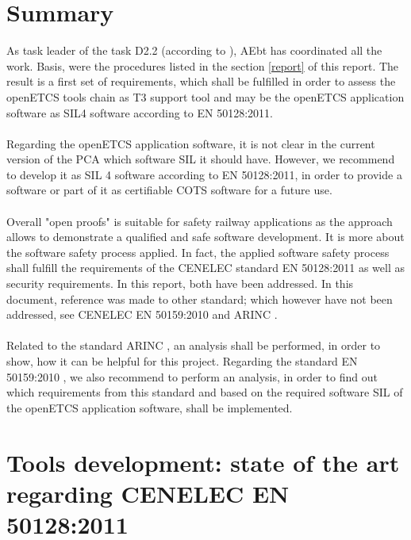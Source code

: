 \documentclass{template/openetcs_report}
\begin{document}
\chapter{Summary}
As task leader of the task D2.2 (according to \cite{FPP13}), AEbt has coordinated all the work. Basis, were the procedures listed in the section \ref{report} of this report. The result is a first set of requirements, which shall be fulfilled in order to assess the openETCS tools chain as T3 support tool and may be the openETCS application software as SIL4 software according to EN 50128:2011. \\\\Regarding the openETCS application software, it is not clear in the current version of the PCA \cite{PCA12} which software SIL it should have. However, we recommend to develop it as SIL 4 software according to EN 50128:2011, in order to provide a software or part of it as certifiable COTS software for a future use.\\\\
Overall "open proofs" is suitable for safety railway applications as the approach allows to demonstrate a qualified and safe software development. It is more about the software safety process applied. In fact, the applied software safety process shall fulfill the requirements of the CENELEC standard EN 50128:2011 as well as security requirements. In this report, both have been addressed.
In this document, reference was made to other standard; which however have not been addressed, see CENELEC EN 50159:2010 \cite{EN50159} and ARINC \cite{ARINC}.\\\\
Related to the standard ARINC \cite{ARINC}, an analysis shall be performed, in order to show, how it can be helpful for this project. Regarding the standard EN 50159:2010 \cite{EN50159}, we also recommend to perform an analysis, in order to find out which requirements from this standard and based on the required software SIL of the openETCS application software, shall be implemented.





\nocite{*}




\appendix

\chapter{Tools development: state of the art regarding CENELEC EN 50128:2011}
\label{annexA}
\end{document}
